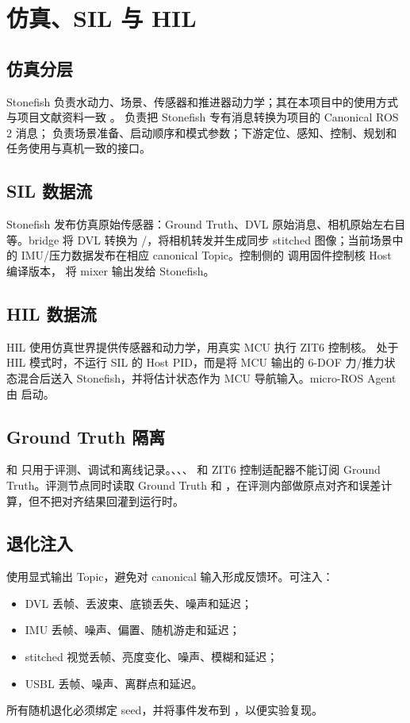 \chapter{仿真、SIL 与 HIL}
\label{ch:simulation}

\section{仿真分层}
Stonefish 负责水动力、场景、传感器和推进器动力学；其在本项目中的使用方式与项目文献资料一致 \cite{stonefish,youlongrepo}。 负责把 Stonefish 专有消息转换为项目的 Canonical ROS 2 消息； 负责场景准备、启动顺序和模式参数；下游定位、感知、控制、规划和任务使用与真机一致的接口。

\section{SIL 数据流}
Stonefish 发布仿真原始传感器：Ground Truth、DVL 原始消息、相机原始左右目等。bridge 将 DVL 转换为 /，将相机转发并生成同步 stitched 图像；当前场景中的 IMU/压力数据发布在相应 canonical Topic。控制侧的  调用固件控制核 Host 编译版本， 将 mixer 输出发给 Stonefish。

\section{HIL 数据流}
HIL 使用仿真世界提供传感器和动力学，用真实 MCU 执行 ZIT6 控制核。 处于 HIL 模式时，不运行 SIL 的 Host PID，而是将 MCU 输出的 6-DOF 力/推力状态混合后送入 Stonefish，并将估计状态作为 MCU 导航输入。micro-ROS Agent 由  启动。

\section{Ground Truth 隔离}
 和  只用于评测、调试和离线记录。、、、 和 ZIT6 控制适配器不能订阅 Ground Truth。评测节点同时读取 Ground Truth 和 ，在评测内部做原点对齐和误差计算，但不把对齐结果回灌到运行时。

\section{退化注入}
 使用显式输出 Topic，避免对 canonical 输入形成反馈环。可注入：
\begin{itemize}
  \item DVL 丢帧、丢波束、底锁丢失、噪声和延迟；
  \item IMU 丢帧、噪声、偏置、随机游走和延迟；
  \item stitched 视觉丢帧、亮度变化、噪声、模糊和延迟；
  \item USBL 丢帧、噪声、离群点和延迟。
\end{itemize}
所有随机退化必须绑定 seed，并将事件发布到 ，以便实验复现。

